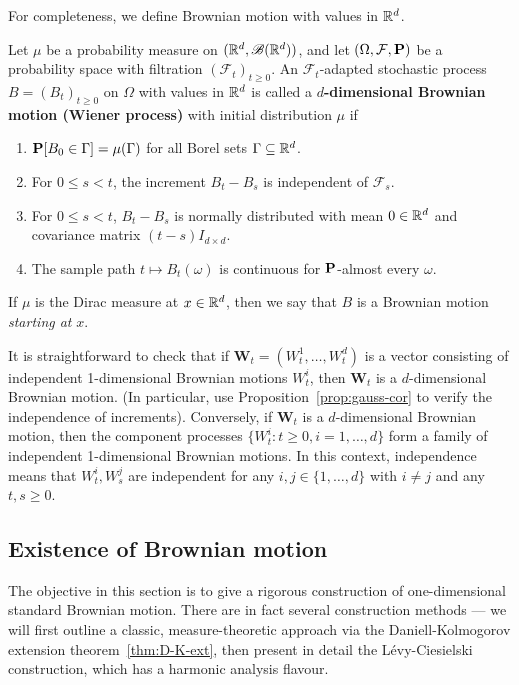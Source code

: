 For completeness, we define Brownian motion with values in $\mathbb{R}^d$.
\begin{definition}
Let $\mu$ be a probability measure on $(\mathbb{R}^d, \mathscr{B}(\mathbb{R}^d))$, and let $(\Omega,\mathcal{F},\mathbf{P})$ be a probability space with filtration $(\mathcal{F}_t)_{t\ge 0}$. An $\mathcal{F}_t$-adapted stochastic process $B = (B_t)_{t \ge 0}$ on $\Omega$ with values in $\mathbb{R}^d$ is called a \textbf{$d$-dimensional Brownian motion (Wiener process)} with initial distribution $\mu$ if
\begin{enumerate}[\upshape (i)]
    \item $\mathbf{P}[B_0 \in \Gamma] = \mu(\Gamma)$ for all Borel sets $\Gamma \subseteq\mathbb{R}^d$.
    \item For $0\le s < t$, the increment $B_t - B_s$ is independent of $\mathcal{F}_s$.
    \item For $0\le s < t$, $B_t - B_s$ is normally distributed with mean $0\in\mathbb{R}^d$ and covariance matrix $(t-s)I_{d\times d}$.
    \item The sample path $t\mapsto B_t(\omega)$ is continuous for $\mathbf{P}$-almost every $\omega$.
\end{enumerate}
If $\mu$ is the Dirac measure at $x\in\mathbb{R}^d$, then we say that $B$ is a Brownian motion \emph{starting at} $x$.
\end{definition}
It is straightforward to check that if $\mathbf{W}_t = (W^1_t,\ldots, W^d_t)$ is a vector consisting of independent 1-dimensional Brownian motions $W^i_t$, then $\mathbf{W}_t$ is a $d$-dimensional Brownian motion. (In particular, use Proposition~\ref{prop:gauss-cor} to verify the independence of increments). Conversely, if $\mathbf{W}_t$ is a $d$-dimensional Brownian motion, then the component processes $\{ W^i_t : t\ge 0, i = 1,\ldots, d\}$ form a family of independent 1-dimensional Brownian motions. In this context, independence means that $W^i_t, W^j_s$ are independent for any $i, j\in \{1,\ldots, d\}$ with $i\ne j$ and any $t, s\ge 0$.

\subsection{Existence of Brownian motion}
\label{sec:3-exist}

The objective in this section is to give a rigorous construction of one-dimensional standard Brownian motion. There are in fact several construction methods --- we will first outline a classic, measure-theoretic approach via the Daniell-Kolmogorov extension theorem~\eqref{thm:D-K-ext}, then present in detail the L\'{e}vy-Ciesielski construction, which has a harmonic analysis flavour.

